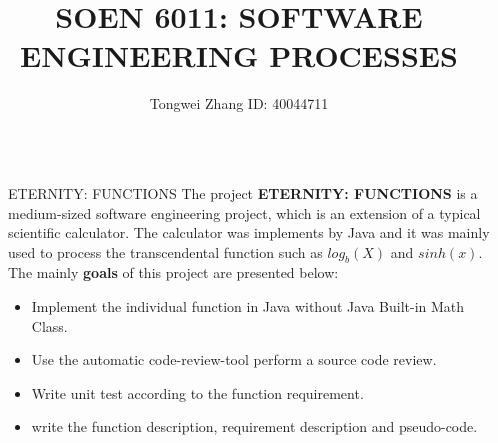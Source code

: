 \documentclass[final]{beamer}
\title{SOEN 6011: SOFTWARE ENGINEERING PROCESSES} %
\author{Tongwei Zhang ID: 40044711} %
\institute{Concordia University: Department of Computer Science and Software Engineering} %
\newlength{\sepwid}
\newlength{\onecolwid}
\begin{document}

\setlength{\belowcaptionskip}{2ex} %
\setlength\belowdisplayshortskip{2ex} %

\begin{frame}[t] %

\begin{columns}[t] %

\begin{column}{\sepwid}\end{column} %

\begin{column}{\onecolwid} %


\begin{alertblock}{ETERNITY: FUNCTIONS }
The project \textbf{ETERNITY: FUNCTIONS} is a medium-sized software engineering project, which is an extension of a typical scientific calculator. The calculator was implements by Java and it was mainly used to process the transcendental function such as $log_b (X)$ and $sinh(x)$. The mainly \textbf{goals} of this project are presented below:
\begin{itemize}
\item Implement the individual function in Java without Java Built-in Math Class.
\item Use the automatic code-review-tool perform a source code review. 
\item Write unit test according to the function requirement.
\item write the function description, requirement description and pseudo-code.
\end{itemize}
\end{alertblock}



\end{column}
\end{columns}
\end{frame}
\end{document}
